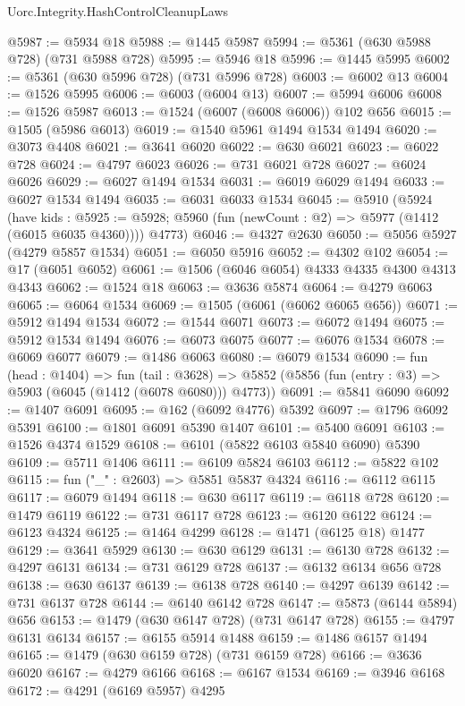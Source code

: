 \begin{lexlean}{Uorc.Integrity.HashControlCleanupLaws}
\begin{coremodule}
@5987 := @5934 @18
@5988 := @1445 @5987
@5994 := @5361 (@630 @5988 @728) (@731 @5988 @728)
@5995 := @5946 @18
@5996 := @1445 @5995
@6002 := @5361 (@630 @5996 @728) (@731 @5996 @728)
@6003 := @6002 @13
@6004 := @1526 @5995
@6006 := @6003 (@6004 @13)
@6007 := @5994 @6006
@6008 := @1526 @5987
@6013 := @1524 (@6007 (@6008 @6006)) @102 @656
@6015 := @1505 (@5986 @6013)
@6019 := @1540 @5961 @1494 @1534 @1494
@6020 := @3073 @4408
@6021 := @3641 @6020
@6022 := @630 @6021
@6023 := @6022 @728
@6024 := @4797 @6023
@6026 := @731 @6021 @728
@6027 := @6024 @6026
@6029 := @6027 @1494 @1534
@6031 := @6019 @6029 @1494
@6033 := @6027 @1534 @1494
@6035 := @6031 @6033 @1534
@6045 := @5910
    (@5924
      (have kids : @5925 := @5928; @5960 (fun (newCount : @2) => @5977 (@1412 (@6015 @6035 @4360))))
      @4773)
@6046 := @4327 @2630
@6050 := @5056 @5927 (@4279 @5857 @1534)
@6051 := @6050 @5916
@6052 := @4302 @102
@6054 := @17 (@6051 @6052)
@6061 := @1506 (@6046 @6054) @4333 @4335 @4300 @4313 @4343
@6062 := @1524 @18
@6063 := @3636 @5874
@6064 := @4279 @6063
@6065 := @6064 @1534
@6069 := @1505 (@6061 (@6062 @6065 @656))
@6071 := @5912 @1494 @1534
@6072 := @1544 @6071
@6073 := @6072 @1494
@6075 := @5912 @1534 @1494
@6076 := @6073 @6075
@6077 := @6076 @1534
@6078 := @6069 @6077
@6079 := @1486 @6063
@6080 := @6079 @1534
@6090 := fun (head : @1404) =>
  fun (tail : @3628) =>
  @5852 (@5856 (fun (entry : @3) => @5903 (@6045 (@1412 (@6078 @6080))) @4773))
@6091 := @5841 @6090
@6092 := @1407 @6091
@6095 := @162 (@6092 @4776) @5392
@6097 := @1796 @6092 @5391
@6100 := @1801 @6091 @5390 @1407
@6101 := @5400 @6091
@6103 := @1526 @4374 @1529
@6108 := @6101 (@5822 @6103 @5840 @6090) @5390
@6109 := @5711 @1406
@6111 := @6109 @5824 @6103
@6112 := @5822 @102
@6115 := fun ("_" : @2603) => @5851 @5837 @4324
@6116 := @6112 @6115
@6117 := @6079 @1494
@6118 := @630 @6117
@6119 := @6118 @728
@6120 := @1479 @6119
@6122 := @731 @6117 @728
@6123 := @6120 @6122
@6124 := @6123 @4324
@6125 := @1464 @4299
@6128 := @1471 (@6125 @18) @1477
@6129 := @3641 @5929
@6130 := @630 @6129
@6131 := @6130 @728
@6132 := @4297 @6131
@6134 := @731 @6129 @728
@6137 := @6132 @6134 @656 @728
@6138 := @630 @6137
@6139 := @6138 @728
@6140 := @4297 @6139
@6142 := @731 @6137 @728
@6144 := @6140 @6142 @728
@6147 := @5873 (@6144 @5894) @656
@6153 := @1479 (@630 @6147 @728) (@731 @6147 @728)
@6155 := @4797 @6131 @6134
@6157 := @6155 @5914 @1488
@6159 := @1486 @6157 @1494
@6165 := @1479 (@630 @6159 @728) (@731 @6159 @728)
@6166 := @3636 @6020
@6167 := @4279 @6166
@6168 := @6167 @1534
@6169 := @3946 @6168
@6172 := @4291 (@6169 @5957) @4295

\end{coremodule}
\end{lexlean}
